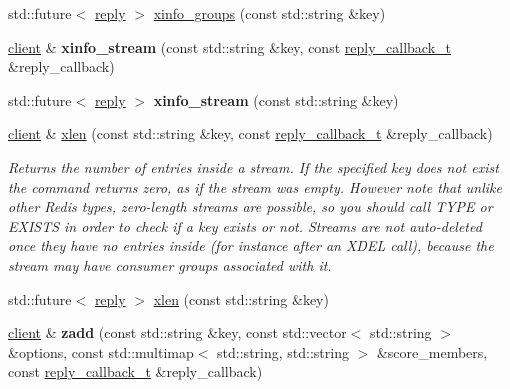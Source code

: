 \begin{DoxyCompactItemize}
\item 
std\+::future$<$ \mbox{\hyperlink{classcpp__redis_1_1reply}{reply}} $>$ \mbox{\hyperlink{classcpp__redis_1_1client_a7c8b502b2d339556f208c36513c94723}{xinfo\+\_\+groups}} (const std\+::string \&key)
\item 
\mbox{\label{classcpp__redis_1_1client_a097b1d00c101db4c90c27cd480f0aa25}} 
\mbox{\hyperlink{classcpp__redis_1_1client}{client}} \& {\bfseries xinfo\+\_\+stream} (const std\+::string \&key, const \mbox{\hyperlink{classcpp__redis_1_1client_af7a65eb21aa25230bfbb0b0203c4fc04}{reply\+\_\+callback\+\_\+t}} \&reply\+\_\+callback)
\item 
\mbox{\label{classcpp__redis_1_1client_a0d3da114d32c3dc79eab814894592ddb}} 
std\+::future$<$ \mbox{\hyperlink{classcpp__redis_1_1reply}{reply}} $>$ {\bfseries xinfo\+\_\+stream} (const std\+::string \&key)
\item 
\mbox{\hyperlink{classcpp__redis_1_1client}{client}} \& \mbox{\hyperlink{classcpp__redis_1_1client_a31bd2e133d34097af085e3e024c14a0f}{xlen}} (const std\+::string \&key, const \mbox{\hyperlink{classcpp__redis_1_1client_af7a65eb21aa25230bfbb0b0203c4fc04}{reply\+\_\+callback\+\_\+t}} \&reply\+\_\+callback)
\begin{DoxyCompactList}\small\item\em Returns the number of entries inside a stream. If the specified key does not exist the command returns zero, as if the stream was empty. However note that unlike other Redis types, zero-\/length streams are possible, so you should call T\+Y\+PE or E\+X\+I\+S\+TS in order to check if a key exists or not. Streams are not auto-\/deleted once they have no entries inside (for instance after an X\+D\+EL call), because the stream may have consumer groups associated with it. \end{DoxyCompactList}\item 
std\+::future$<$ \mbox{\hyperlink{classcpp__redis_1_1reply}{reply}} $>$ \mbox{\hyperlink{classcpp__redis_1_1client_a688bed690967583c3aa6a7d72c8c03f9}{xlen}} (const std\+::string \&key)
\item 
\mbox{\label{classcpp__redis_1_1client_a3440c0427f9e49c261fed178b7c1a943}} 
\mbox{\hyperlink{classcpp__redis_1_1client}{client}} \& {\bfseries zadd} (const std\+::string \&key, const std\+::vector$<$ std\+::string $>$ \&options, const std\+::multimap$<$ std\+::string, std\+::string $>$ \&score\+\_\+members, const \mbox{\hyperlink{classcpp__redis_1_1client_af7a65eb21aa25230bfbb0b0203c4fc04}{reply\+\_\+callback\+\_\+t}} \&reply\+\_\+callback)

\end{DoxyCompactItemize}
